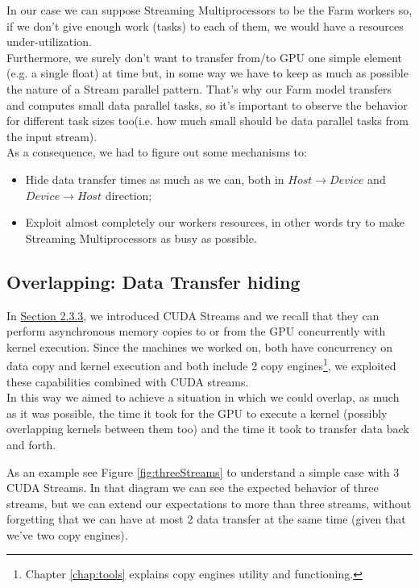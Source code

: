 	
	In our case we can suppose Streaming Multiprocessors to be the Farm workers so, if we don't give enough work (tasks) to each of them, we would have a resources under-utilization.\\
	Furthermore, we surely don't want to transfer from/to GPU one simple element (e.g. a single float) at time but, in some way we have to keep as much as possible the nature of a Stream parallel pattern. That's why our Farm model transfers and computes small data parallel tasks, so it's important to observe the behavior for different task sizes too(i.e. how much small should be data parallel tasks from the input stream).\\	
	As a consequence, we had to figure out some mechanisms to:
	\begin{itemize}
		\item Hide data transfer times as much as we can, both in  \(Host \rightarrow Device\)  and  \(Device \rightarrow Host\)  direction;
		\item Exploit almost completely our workers resources, in other words try to make Streaming Multiprocessors as busy as possible.
	\end{itemize}

	
	\subsection{Overlapping: Data Transfer hiding}
	In \hyperref[subs:stream]{Section 2.3.3}, we introduced CUDA Streams and we recall that they can perform asynchronous memory copies to or from the GPU	concurrently with kernel execution. 
	Since the machines we worked on, both have concurrency on data copy and kernel execution and both include 2 copy engines\footnote{Chapter \ref{chap:tools} explains copy engines utility and functioning.}, we exploited these capabilities combined with CUDA streams.\\
	In this way we aimed to achieve a situation in which we could overlap, as much as it was possible, the time it took for the GPU to execute a kernel (possibly overlapping kernels between them too) and the time it took to transfer data back and forth.
	
	As an example see Figure \ref{fig:threeStreams} to understand a simple case with 3 CUDA Streams.
	In that diagram we can see the expected behavior of three streams, but we can extend our expectations to more than three streams, without forgetting that we can have at most 2 data transfer at the same time (given that we've two copy engines).
	
